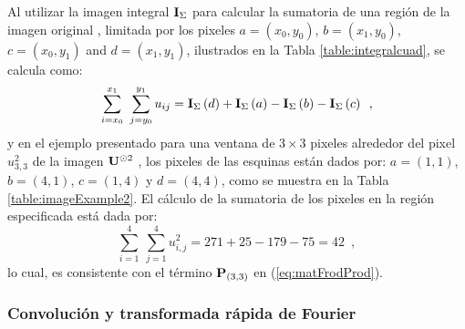 Al utilizar la imagen integral $\mathbf{I}_{\Sigma}$ para calcular la sumatoria de una región de la imagen original , limitada por los pixeles $a=\left(x_{0},y_{0}\right)$,
$b=\left(x_{1},y_{0}\right)$, $c=\left(x_{0},y_{1}\right)$ and $d=\left(x_{1},y_{1}\right)$, ilustrados en la Tabla \ref{table:integralcuad}, se calcula como: 
%
\begin{equation}
\sum_{i=x_{0}}^{x_{1}}~\sum_{j=y_{0}}^{y_{1}}u_{ij}=\mathbf{I}_{\Sigma}\left(d\right)+\mathbf{I}_{\Sigma}\left(a\right)-\mathbf{I}_{\Sigma}\left(b\right)-\mathbf{I}_{\Sigma}\left(c\right) \enspace ,
\end{equation}
%
y en el ejemplo presentado para una ventana de $3\times3$ pixeles alrededor del pixel $u_{3,3}^2$ de la imagen $\mathbf{U}^{\odot2}$ , los pixeles de las esquinas están dados por: $a=\left(1,1\right)$, $b=\left(4,1\right)$,
$c=\left(1,4\right)$ y $d=\left(4,4\right)$, como se muestra en la Tabla \ref{table:imageExample2}. El cálculo de la sumatoria de los pixeles en la región especificada está dada por: 
%
\begin{equation}
\sum_{i=1}^{4}~\sum_{j=1}^{4}u_{i,j}^2=271+25-179-75=42 \enspace ,
\end{equation}
%
lo cual, es consistente con el término $\mathbf{P}_{\left(3,3\right)}$ en (\ref{eq:matFrodProd}). 



\subsubsection{Convolución y transformada rápida de Fourier}

